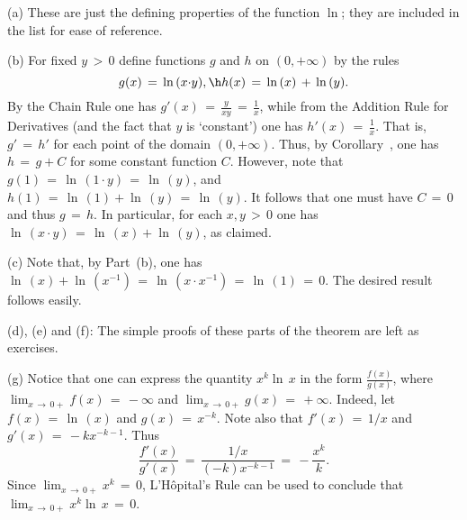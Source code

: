 \V

        (a) These are just the defining properties of the function $\ln$; they are included in the list for ease of reference.

\V

        (b) For fixed $y\,>\,0$ define functions $g$ and $h$ on $(0,+{\infty})$ by the rules
        \begin{displaymath}
        g(x) \,=\, {\ln}\,(x{\cdot}y), \h h(x) \,=\, {\ln}\,(x) \,+\, {\ln}\,(y).
        \end{displaymath}
    By the Chain Rule one has $g'(x) \,=\, {\displaystyle \frac{y}{xy} \,=\, \frac{1}{x}}$,
    while from the Addition Rule for Derivatives (and the fact that $y$ is `constant') one has $h'(x) \,=\, {\displaystyle \frac{1}{x}}$.
    That is, $g' \,=\, h'$ for each point of the domain $(0,+{\infty})$.
    Thus, by Corollary~, one has $h \,=\, g+C$ for some constant function $C$.
    However, note that $g(1) \,=\, {\ln}\,(1{\cdot}y) \,=\, {\ln}\,(y)$, and $h(1) \,=\, {\ln}\,(1) + {\ln}\,(y) \,=\, {\ln}\,(y)$.
    It follows that one must have $C \,=\, 0$ and thus $g \,=\, h$.
    In particular, for each $x,y\,>\,0$ one has ${\ln}\,(x{\cdot}y) \,=\, {\ln}\,(x) + {\ln}\,(y)$, as claimed.

\V

        (c) Note that, by Part~(b), one has ${\ln}\,(x) + {\ln}\,(x^{-1}) \,=\, {\ln}\,(x{\cdot}x^{-1}) \,=\, {\ln}\,(1) \,=\, 0$.
    The desired result follows easily.

\V

        (d), (e) and (f): The simple proofs of these parts of the theorem are left as exercises.

\V

        (g) Notice that one can express the quantity $x^{k}{\ln}\,x$ in the form ${\displaystyle \frac{f(x)}{g(x)}}$, where $\lim_{x \,{\rightarrow}\, 0+} f(x) \,=\, -{\infty}$ and $\lim_{x \,{\rightarrow}\, 0+} g(x) \,=\, +{\infty}$.
    Indeed, let $f(x) \,=\, {\ln}\,(x)$ and $g(x) \,=\, x^{-k}$.
    Note also that $f'(x) \,=\, 1/x$ and $g'(x) \,=\, -kx^{-k-1}$.
    Thus
        \begin{displaymath}
        \frac{f'(x)}{g'(x)} \,=\, \frac{1/x}{(-k)x^{-k-1}} \,=\, -\frac{x^{k}}{k}.
        \end{displaymath}
    Since $\lim_{x \,{\rightarrow}\, 0+} x^{k} \,=\, 0$, L'H\^{o}pital's Rule can be used to conclude that $\lim_{x \,{\rightarrow}\, 0+} x^{k}{\ln}\,x \,=\, 0$. \Q

\VV

